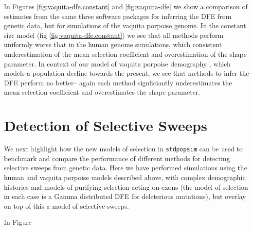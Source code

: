 \documentclass[hidelinks]{article}
\newcommand{\stdpopsim}{\texttt{stdpopsim}\xspace}
\begin{document}
    In Figures \ref{fig:vaquita-dfe.constant} and \ref{fig:vaquita-dfe} we show a comparison of estimates
    from the same three software packages for inferring the DFE from genetic data, but for simulations of the
    vaquita porpoise genome. In the constant size model (fig \ref{fig:vaquita-dfe.constant}) we see that all methods
    perform uniformly worse that in the human genome simulations, which consistent underestimation of the mean selection coefficient    
    and overestimation of the shape parameter. 
    In context of our model of vaquita porpoise demography \citep{robinson2022critically}, which models a population
    decline towards the present, we see that methods to infer the DFE perform no better-- again each method 
    signficiantly underestimates the mean selection coefficient and overestimates the shape parameter.

\section*{Detection of Selective Sweeps}
    \label{sweeps}
    We next highlight how the new models of selection in \stdpopsim can be used to benchmark and compare
    the performance of different methods for detecting selective sweeps from genetic data. 
    Here we have performed simulations using the human and vaquita porpoise models described above, 
    with complex demographic histories and models of purifying selection acting on exons 
    (the model of selection in each case is a Gamma distributed DFE for deleterious mutations),
    but overlay on top of this a model of selective sweeps.

  

    In Figure \

\lipsum[20-25]
\end{document}
